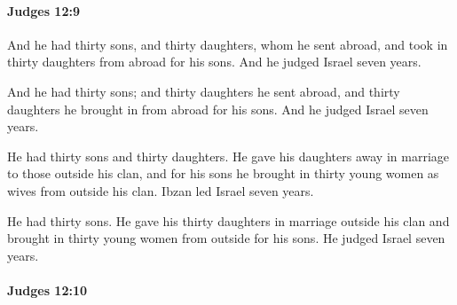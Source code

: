 		\paragraph{Judges 12:9} %
			\label{JUDGES-12-9}

			And he had thirty sons, and thirty daughters, whom he sent abroad, and took in thirty daughters from abroad for his sons. And he judged Israel seven years.

			\begin{versebox}
					\item[BHS] 
					\item[ASV] And he had thirty sons; and thirty daughters he sent abroad, and thirty daughters he brought in from abroad for his sons. And he judged Israel seven years.
					\item[NIV] He had thirty sons and thirty daughters. He gave his daughters away in marriage to those outside his clan, and for his sons he brought in thirty young women as wives from outside his clan. Ibzan led Israel seven years.
					\item[NRSV] He had thirty sons. He gave his thirty daughters in marriage outside his clan and brought in thirty young women from outside for his sons. He judged Israel seven years.
			\end{versebox}

		\paragraph{Judges 12:10} %
			\label{JUDGES-12-10}

